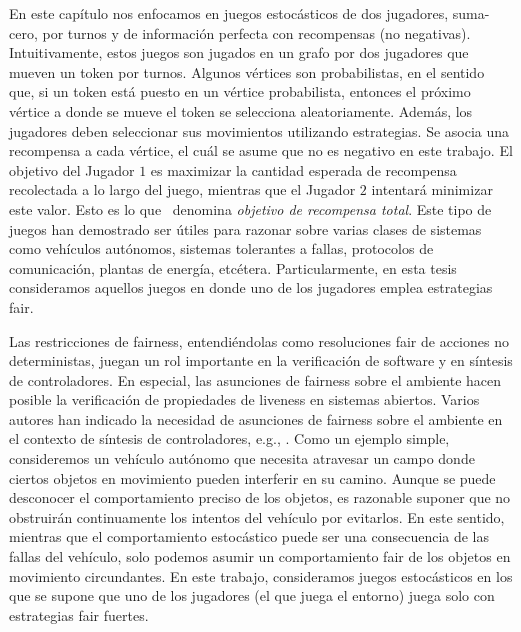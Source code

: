 En este capítulo nos enfocamos en juegos estocásticos de dos jugadores, suma-cero, por turnos y de información perfecta con recompensas (no negativas)\cite{FilarV96}. 
Intuitivamente, estos juegos son jugados en un grafo por dos jugadores que mueven un token por turnos. Algunos vértices son probabilistas, en el sentido que, si un token está puesto en un vértice probabilista, entonces el próximo vértice a donde se mueve el token se selecciona aleatoriamente. Además, los jugadores deben seleccionar sus movimientos utilizando estrategias. Se asocia una recompensa a cada vértice, el cuál se asume que no es negativo en este trabajo. El objetivo del Jugador $1$ es maximizar la cantidad esperada de recompensa recolectada a lo largo del juego, mientras que el Jugador $2$ intentará minimizar este valor. Esto es lo que~\cite{SvorenovaKwiatkowska16} denomina \emph{objetivo de recompensa total}.
Este tipo de juegos han demostrado ser útiles para razonar sobre varias clases de sistemas como vehículos autónomos, sistemas tolerantes a fallas, protocolos de comunicación, plantas de energía, etcétera.  %
Particularmente, en esta tesis consideramos aquellos juegos en donde uno de los jugadores emplea estrategias fair.

Las restricciones de fairness, entendiéndolas como resoluciones fair de acciones no deterministas, juegan un rol importante en la verificación de software y en síntesis de controladores.
En especial, las asunciones de fairness sobre el ambiente hacen posible la verificación de propiedades de liveness en sistemas abiertos. 
Varios autores han indicado la necesidad de asunciones de fairness sobre el ambiente en el contexto de síntesis de controladores, e.g., \cite{DBLP:conf/fossacs/AsarinCV10,DBLP:conf/icse/DIppolitoBPU11}.
Como un ejemplo simple, consideremos un vehículo autónomo que necesita atravesar un campo donde ciertos objetos en movimiento pueden interferir en su camino. Aunque se puede desconocer el comportamiento preciso de los objetos, es razonable suponer que no obstruirán continuamente los intentos del vehículo por evitarlos. En este sentido, mientras que el comportamiento estocástico puede ser una consecuencia de las fallas del vehículo, solo podemos asumir un comportamiento fair de los objetos en movimiento circundantes.
En este trabajo, consideramos juegos estocásticos en los que se supone que uno de los jugadores (el que juega el entorno) juega solo con estrategias fair fuertes.

